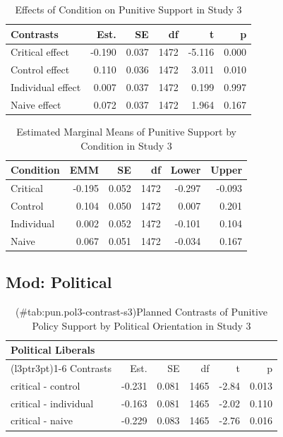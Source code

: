 \documentclass[
]{book}
\begin{document}
\begin{table}

\caption{\label{tab:pun-contrast-s3}Effects of Condition on Punitive Support in Study 3}
\centering
\fontsize{13}{15}\selectfont
\begin{tabular}[t]{lrrrrr}
\toprule
Contrasts & Est. & SE & df & t & p\\
\midrule
Critical effect & -0.190 & 0.037 & 1472 & -5.116 & 0.000\\
Control effect & 0.110 & 0.036 & 1472 & 3.011 & 0.010\\
Individual effect & 0.007 & 0.037 & 1472 & 0.199 & 0.997\\
Naive effect & 0.072 & 0.037 & 1472 & 1.964 & 0.167\\
\bottomrule
\end{tabular}
\end{table}

\begin{table}

\caption{\label{tab:pun-contrast-s3}Estimated Marginal Means of Punitive Support by Condition in Study 3}
\centering
\fontsize{13}{15}\selectfont
\begin{tabular}[t]{lrrrrr}
\toprule
Condition & EMM & SE & df & Lower & Upper\\
\midrule
Critical & -0.195 & 0.052 & 1472 & -0.297 & -0.093\\
Control & 0.104 & 0.050 & 1472 & 0.007 & 0.201\\
Individual & 0.002 & 0.052 & 1472 & -0.101 & 0.104\\
Naive & 0.067 & 0.051 & 1472 & -0.034 & 0.167\\
\bottomrule
\end{tabular}
\end{table}

\hypertarget{mod-political-6}{%
\subsection{Mod: Political}\label{mod-political-6}}

\begin{table}

\caption{(\#tab:pun.pol3-contrast-s3)Planned Contrasts of Punitive Policy Support by Political Orientation in Study 3}
\centering
\fontsize{13}{15}\selectfont
\begin{tabular}[t]{lrrrrr}
\toprule
\multicolumn{6}{l}{Political Liberals} \\
\cmidrule(l{3pt}r{3pt}){1-6}
Contrasts & Est. & SE & df & t & p\\
\midrule
critical - control & -0.231 & 0.081 & 1465 & -2.84 & 0.013\\
critical - individual & -0.163 & 0.081 & 1465 & -2.02 & 0.110\\
critical - naive & -0.229 & 0.083 & 1465 & -2.76 & 0.016\\
\bottomrule
\end{tabular}
\end{table}
\end{document}
